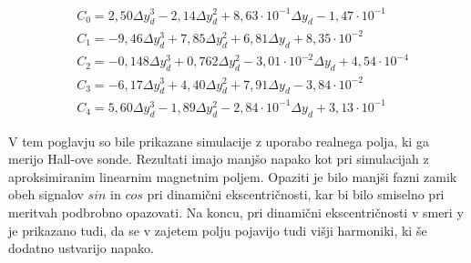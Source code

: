 \begin{eqnarray}
&C_0 =2,50\Delta y_d^{3}-2,14\Delta y_d^{2}+8,63\cdot 10^{-1}\Delta y_d-1,47\cdot 10^{-1}\\                           
&C_1 =-9,46\Delta y_d^{3}+7,85\Delta y_d^{2}+6,81\Delta y_d+8,35\cdot 10^{-2} \\                                       
&C_2 =-0,148\Delta y_d^{3}+0,762\Delta y_d^{2}-3,01\cdot 10^{-2}\Delta y_d+4,54\cdot 10^{-4} \\
&C_3 =-6,17\Delta y_d^{3}+4,40\Delta y_d^{2}+7,91\Delta y_d-3,84\cdot 10^{-2} \\                                       
&C_4 =5,60\Delta y_d^{3}-1,89\Delta y_d^{2}-2,84\cdot 10^{-1}\Delta y_d+3,13\cdot 10^{-1}       
\end{eqnarray}

V tem poglavju so bile prikazane simulacije z uporabo realnega polja, ki ga merijo Hall-ove sonde. Rezultati imajo manjšo napako kot pri simulacijah z aproksimiranim linearnim magnetnim poljem. Opaziti je bilo manjši fazni zamik obeh signalov $sin$ in $cos$ pri dinamični ekscentričnosti, kar bi bilo smiselno pri meritvah podbrobno opazovati. Na koncu, pri dinamični ekscentričnosti v smeri y je prikazano tudi, da se v zajetem polju pojavijo tudi višji harmoniki, ki še dodatno ustvarijo napako.